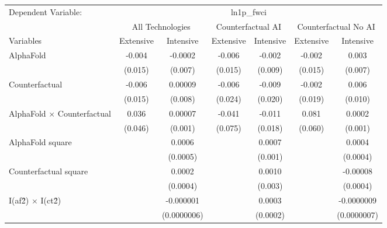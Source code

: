 \begingroup
\centering
\begin{tabular}{lcccccc}
   \tabularnewline \midrule \midrule
   Dependent Variable: & \multicolumn{6}{c}{ln1p\_fwci}\\
 & \multicolumn{2}{c}{All Technologies} & \multicolumn{2}{c}{Counterfactual AI} & \multicolumn{2}{c}{Counterfactual No AI} \\
\cmidrule(lr){1-1}\cmidrule(lr){2-3} \cmidrule(lr){4-5} \cmidrule(lr){6-7}
Variables & \multicolumn{1}{c}{Extensive} & \multicolumn{1}{c}{Intensive} & \multicolumn{1}{c}{Extensive} & \multicolumn{1}{c}{Intensive} & \multicolumn{1}{c}{Extensive} & \multicolumn{1}{c}{Intensive} \\
\cmidrule(lr){1-1}\cmidrule(lr){2-2} \cmidrule(lr){3-3} \cmidrule(lr){4-4} \cmidrule(lr){5-5} \cmidrule(lr){6-6} \cmidrule(lr){7-7}
   AlphaFold                          & -0.004  & -0.0002     & -0.006  & -0.002   & -0.002  & 0.003\\   
                                      & (0.015) & (0.007)     & (0.015) & (0.009)  & (0.015) & (0.007)\\   
   Counterfactual                     & -0.006  & 0.00009     & -0.006  & -0.009   & -0.002  & 0.006\\   
                                      & (0.015) & (0.008)     & (0.024) & (0.020)  & (0.019) & (0.010)\\   
   AlphaFold $\times$ Counterfactual  & 0.036   & 0.00007     & -0.041  & -0.011   & 0.081   & 0.0002\\   
                                      & (0.046) & (0.001)     & (0.075) & (0.018)  & (0.060) & (0.001)\\   
   AlphaFold square                   &         & 0.0006      &         & 0.0007   &         & 0.0004\\   
                                      &         & (0.0005)    &         & (0.001)  &         & (0.0004)\\   
   Counterfactual square              &         & 0.0002      &         & 0.0010   &         & -0.00008\\   
                                      &         & (0.0004)    &         & (0.003)  &         & (0.0004)\\   
   I(af\^2) $\times$ I(ct\^2)         &         & -0.000001   &         & 0.0003   &         & -0.0000009\\   
                                      &         & (0.0000006) &         & (0.0002) &         & (0.0000007)\\   

\end{tabular}
